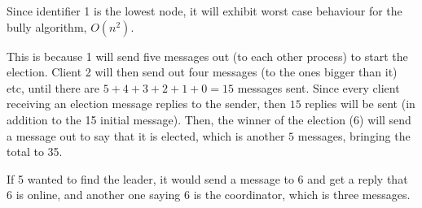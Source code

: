 
Since identifier 1 is the lowest node, it will exhibit worst case behaviour for
the bully algorithm, $O(n^2)$.

This is because 1 will send five messages out (to each other process) to start
the election. Client 2 will then send out four messages (to the ones bigger than
it) etc, until there are $5 + 4 + 3 + 2 + 1 + 0 = 15$ messages sent. Since every
client receiving an election message replies to the sender, then $15$ replies
will be sent (in addition to the 15 initial message). Then, the winner of the
election (6) will send a message out to say that it is elected, which is another
$5$ messages, bringing the total to 35.


If 5 wanted to find the leader, it would send a message to 6 and get a reply
that 6 is online, and another one saying 6 is the coordinator, which is three
messages.
